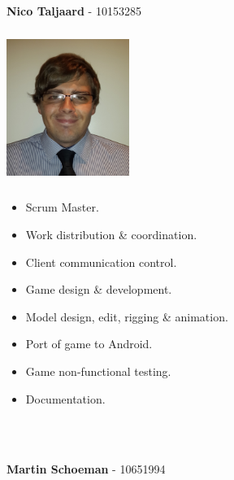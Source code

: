 \documentclass[letterpaper]{article}
\begin{document}
		\vspace{0.2in}
	\section*{\colorbox{black}{}} 
		\vspace{0.1in}
		
		\begin{Large} 
			\textbf{Nico Taljaard} - 10153285 \\
		\end{Large}
		
		\begin{minipage}[l]{0.23\textwidth}
			\begin{flushleft}
				\includegraphics[width=40mm,height=50mm]{Members/NicoTaljaard.jpg}
			\end{flushleft}
		\end{minipage}
		\begin{minipage}[r]{0.75\textwidth}
			\begin{itemize}
				\item Scrum Master.
				\item Work distribution \& coordination.
				\item Client communication control.
				\item Game design \& development.
				\item Model design, edit, rigging \& animation.
				\item Port of game to Android.
				\item Game non-functional testing.
				\item Documentation.
			\end{itemize}
		\end{minipage} \\ \\
		
		\begin{flushleft}
			\begin{Large}
				\textbf{Martin Schoeman} - 10651994 \\
			\end{Large}
		\end{flushleft}
		
\end{document}
